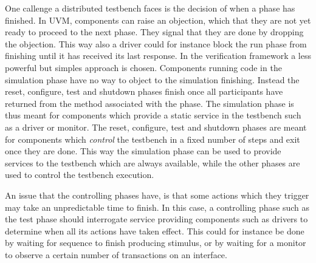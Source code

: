 One callenge a distributed testbench faces is the decision of when a phase has finished. In UVM, components can raise
an objection, which that they are not yet ready to proceed to the next phase. They signal that they are done by
dropping the objection. This way also a driver could for instance block the run phase from finishing until it has
received its last response. In the verification framework a less powerful but simples approach is chosen. Components
running code in the simulation phase have no way to object to the simulation finishing. Instead the reset, configure,
test and shutdown phases finish once all participants have returned from the method associated with the phase. The
simulation phase is thus meant for components which provide a static service in the testbench such as a driver or
monitor. The reset, configure, test and shutdown phases are meant for components which \textit{control} the testbench
in a fixed number of steps and exit once they are done. This way the simulation phase can be used to provide services
to the testbench which are always available, while the other phases are used to control the testbench execution.

An issue that the controlling phases have, is that some actions which they trigger may take an unpredictable time to
finish. In this case, a controlling phase such as the test phase should interrogate service providing components such
as drivers to determine when all its actions have taken effect. This could for instance be done by waiting for
sequence to finish producing stimulus, or by waiting for a monitor to observe a certain number of transactions on an interface.




